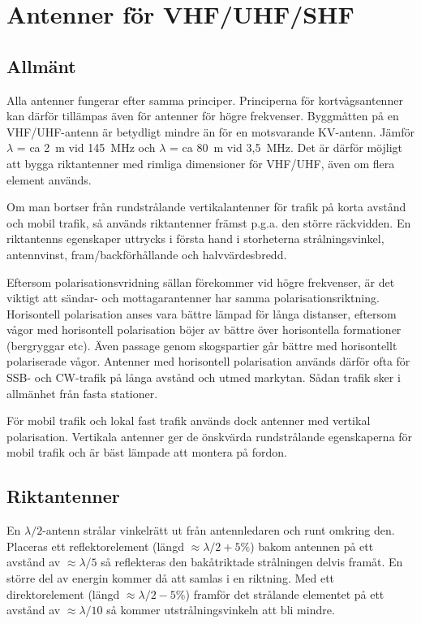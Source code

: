 \section{Antenner för VHF/UHF/SHF}

\subsection{Allmänt}

Alla antenner fungerar efter samma principer. Principerna för
kortvågsantenner kan därför tillämpas även för antenner för högre
frekvenser. Byggmåtten på en VHF/UHF-antenn är betydligt mindre än för
en motsvarande KV-antenn. Jämför \(\lambda\) = ca 2~m vid 145~MHz och
\(\lambda\) = ca 80~m vid 3,5~MHz. Det är därför möjligt att bygga
riktantenner med rimliga dimensioner för VHF/UHF, även om flera
element används.

Om man bortser från rundstrålande vertikalantenner för trafik på korta
avstånd och mobil trafik, så används riktantenner främst p.g.a. den
större räckvidden. En riktantenns egenskaper uttrycks i första hand i
storheterna strålningsvinkel, antennvinst, fram/backförhållande och
halvvärdesbredd.

Eftersom polarisationsvridning sällan förekommer vid högre frekvenser,
är det viktigt att sändar- och mottagarantenner har samma
polarisationsriktning.  Horisontell polarisation anses vara bättre
lämpad för långa distanser, eftersom vågor med horisontell
polarisation böjer av bättre över horisontella formationer (bergryggar
etc). Även passage genom skogspartier går bättre med horisontellt
polariserade vågor.  Antenner med horisontell polarisation används
därför ofta för SSB- och CW-trafik på långa avstånd och utmed
markytan. Sådan trafik sker i allmänhet från fasta stationer.

För mobil trafik och lokal fast trafik används dock antenner med
vertikal polarisation. Vertikala antenner ger de önskvärda
rundstrålande egenskaperna för mobil trafik och är bäst lämpade att
montera på fordon.

\subsection{Riktantenner}

En \(\lambda/2\)-antenn strålar vinkelrätt ut från antennledaren och
runt omkring den.  Placeras ett reflektorelement (längd
\(\approx\lambda/2 + 5\%\)) bakom antennen på ett avstånd av \(\approx
\lambda/5\) så reflekteras den bakåtriktade strålningen delvis
framåt. En större del av energin kommer då att samlas i en
riktning. Med ett direktorelement (längd \(\approx\lambda/2 - 5\%\))
framför det strålande elementet på ett avstånd av
\(\approx\lambda/10\) så kommer utstrålningsvinkeln att bli mindre.

